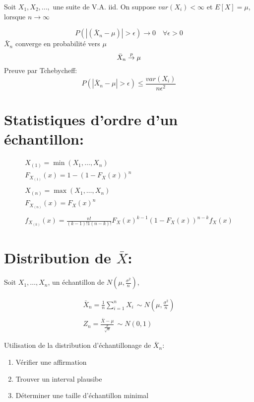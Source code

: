 Soit \(X_1,X_2,...,\) une suite de V.A. iid. On suppose
\(var(X_i)< \infty\) et \(E[X] = \mu\), lorsque \(n \to \infty\)

\[ 
P\left(|\left(\bar{X}_n-\mu\right)|>\epsilon\right)\to 0\quad \forall\epsilon>0
\] \(\bar{X}_n\) converge en probabilité vers \(\mu\) \[
\bar{X}_n\overset{p}\to\mu\\  
\] Preuve par Tchebycheff: \[
P\left(|\bar{X}_n-\mu|>\epsilon\right)\leq\frac{var(X_i)}{n\epsilon^2}
\]

\section{Statistiques d'ordre d'un échantillon:}\label{statistiques-dordre-dun-echantillon}

\begin{gather*}
    X_{(1)}=\min(X_1,\dots, X_n) \\  
    F_{X_{(1)}} (x)= 1 -{(1- F_X (x))}^n \\  
    \\
    X_{(n)}= \max(X_1,\dots,X_n) \\  
    F_{X_{(n)}}(x)={F_X(x)}^n\\
    \\
    f_{X_{(k)}}(x)= \frac{{n!}}{{(k-1)!}1{(n-k)!}}{F_X(x)}^{k-1}{(1-F_X(x))}^{n-k}f_X(x)
\end{gather*}

\section{Distribution de \(\bar{X}\):}\label{distribution-de-barx}

Soit \(X_1,\dots,X_n\), un échantillon de \(N(\mu,\frac{\sigma^2}{n})\),

\begin{gather*}
    \bar{X}_n=\frac{1}{n}\sum_{i=1}^n X_i\, \sim N\left(\mu,\frac{\sigma^2}{n}\right)\\
    \\
    Z_n=\frac{\bar{X}-\mu}{\frac{\sigma}{\sqrt{n}}}\,\sim N(0,1)
\end{gather*}

Utilisation de la distribution d'échantillonage de \(\bar{X}_n\):

\begin{enumerate}
\def\labelenumi{\arabic{enumi}.}
\item
  Vérifier une affirmation
\item
  Trouver un interval plausibe
\item
  Déterminer une taille d'échantillon minimal
\end{enumerate}

